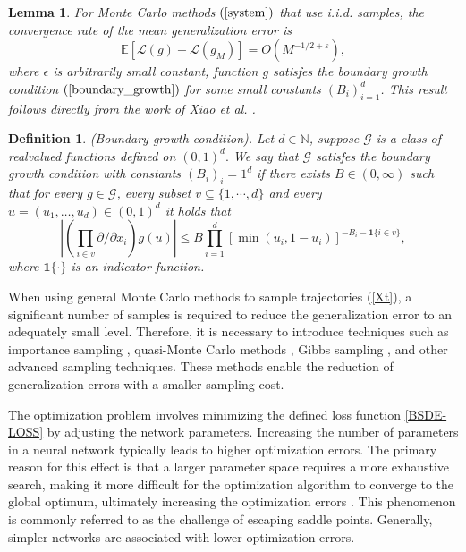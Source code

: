 \documentclass[11pt]{article}
\newtheorem{definition}{Definition}
\newtheorem{lemma}{Lemma}
\begin{document}
\begin{lemma}
For Monte Carlo methods $(\ref{system})$ that use i.i.d. samples, the convergence rate of the mean generalization error is
\begin{equation}\label{generalization}
	\mathbb{E}\left[\mathcal{L}(g)-\mathcal{L}(g_M)\right]=O(M^{-1/2+\varepsilon}),
\end{equation}
where $\epsilon$ is arbitrarily small constant, function $g$ satisfes the boundary growth condition $(\ref{boundary_growth})$ for some small constants $(B_i)_{i=1}^d$.  
This result follows directly from the work of Xiao et al. \textsuperscript{\cite{Xiao}}.
\end{lemma}

\begin{definition}
(Boundary growth condition). Let $d\in\mathbb{N}$, suppose $\mathcal{G}$ is a class of realvalued functions defined on $(0,1)^d.$ We say that $\mathcal{G}$ satisfes the boundary growth condition with constants $(B_i)_i=1^d$ if there exists $B\in(0,\infty)$ such that for every $g\in\mathcal{G}$, every subset $v\subseteq\{1,\cdots,d\}$ and every $u=(u_1,\ldots,u_d)\in(0,1)^d$ it holds that
\begin{equation}\label{boundary_growth}
\left|\left(\prod_{i\in v}\partial/\partial x_i\right)g(u)\right|\leq B\prod_{i=1}^d[\min(u_i,1-u_i)]^{-B_i-\mathbf{1}\{i\in v\}},
\end{equation}
where $\mathbf{1}\{ \cdot \} $ is an indicator function.
\end{definition}


When using general Monte Carlo methods to sample trajectories (\ref{Xt}), a significant number of samples is required to reduce the generalization error to an adequately small level. Therefore, it is necessary to introduce techniques such as importance sampling \textsuperscript{\cite{Importance_sampling}}, quasi-Monte Carlo methods \textsuperscript{\cite{QMC}}, Gibbs sampling \textsuperscript{\cite{Gibbs}}, and other advanced sampling techniques. These methods enable the reduction of generalization errors with a smaller sampling cost.


The optimization problem involves minimizing the defined loss function \ref{BSDE-LOSS} by adjusting the network parameters.
Increasing the number of parameters in a neural network typically leads to higher optimization errors. 
The primary reason for this effect is that a larger parameter space requires a more exhaustive search, making it more difficult for the optimization algorithm to converge to the global optimum, ultimately increasing the optimization errors
\textsuperscript{\cite{Parameter_optimization,Shen_Z}}. This phenomenon is commonly referred to as the challenge of escaping saddle points.
Generally, simpler networks are associated with lower optimization errors.
\end{document}
